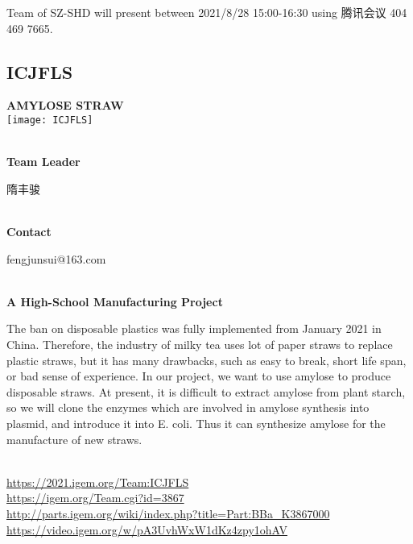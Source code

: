 \vfill{}









Team of SZ-SHD will present between       2021/8/28 15:00-16:30  using 腾讯会议 404 469 7665.
\newpage


\subsection{\textcolor{Blu}{ ICJFLS } }
\vspace{5mm}
\begin{center}
\large{
  \textbf{ AMYLOSE STRAW }\\
  \texttt{[image: ICJFLS]}
}
\end{center}
\textbf{\\Team Leader}

  隋丰骏


\textbf{\\Contact}

  fengjunsui@163.com


\textbf{\\A High-School Manufacturing Project\\}\begin{spacing}{1.5}

The ban on disposable plastics was fully implemented from January 2021 in China. Therefore, the industry of milky tea uses lot of paper straws to replace plastic straws, but it has many drawbacks, such as easy to break, short life span, or bad sense of experience. In our project, we want to use amylose to produce disposable straws. At present, it is difficult to extract amylose from plant starch, so we will clone the enzymes which are involved in amylose synthesis into plasmid, and introduce it into E. coli. Thus it can synthesize amylose for the manufacture of new straws.\end{spacing}
\\

\url{https://2021.igem.org/Team:ICJFLS }\\
\url{https://igem.org/Team.cgi?id=3867 }\\
\url{http://parts.igem.org/wiki/index.php?title=Part:BBa_K3867000 }\\
\url{https://video.igem.org/w/pA3UvhWxW1dKz4zpy1ohAV }\\

\vfill{}









